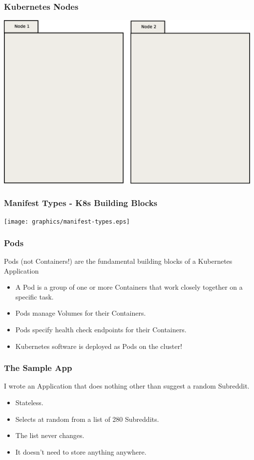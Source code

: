     \begin{frame}
        \frametitle{Kubernetes Nodes}
        \includegraphics[width=\textwidth,height=0.85\textheight,keepaspectratio]{graphics/00-nodes.eps}
    \end{frame}

    \begin{frame}
        \frametitle{Manifest Types - K8s Building Blocks}
        \texttt{[image: graphics/manifest-types.eps]}
    \end{frame}

    \begin{frame}
        \frametitle{Pods}
        Pods (not Containers!) are the fundamental building blocks of a Kubernetes Application\pause
        \begin{itemize}
            \item A Pod is a group of one or more Containers that work closely together on a specific task.\pause
            \item Pods manage Volumes for their Containers.\pause
            \item Pods specify health check endpoints for their Containers.\pause
            \item Kubernetes software is deployed as Pods on the cluster!
        \end{itemize}
    \end{frame}

    \begin{frame}
        \frametitle{The Sample App}
        I wrote an Application that does nothing other than suggest a random Subreddit.\pause
        \begin{itemize}
            \item Stateless.\pause
            \item Selects at random from a list of 280 Subreddits.\pause
            \item The list never changes.\pause
            \item It doesn't need to store anything anywhere.
        \end{itemize}
    \end{frame}

